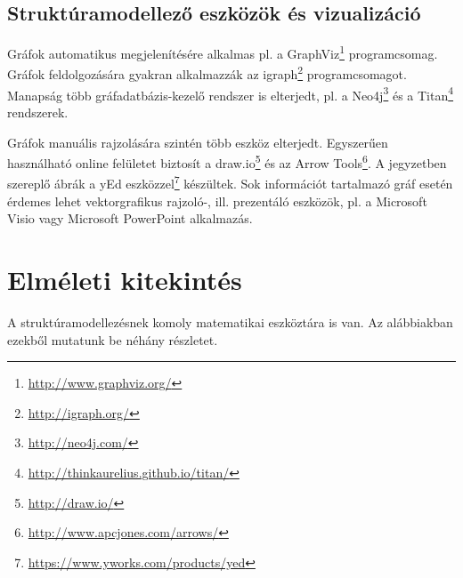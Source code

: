 \subsection{Struktúramodellező eszközök és vizualizáció}

Gráfok automatikus megjelenítésére alkalmas pl. a GraphViz\footnote{\url{http://www.graphviz.org/}} programcsomag. Gráfok feldolgozására gyakran alkalmazzák az igraph\footnote{\url{http://igraph.org/}} programcsomagot. Manapság több gráfadatbázis-kezelő rendszer is elterjedt, pl. a Neo4j\footnote{\url{http://neo4j.com/}} és a Titan\footnote{\url{http://thinkaurelius.github.io/titan/}} rendszerek.

Gráfok manuális rajzolására szintén több eszköz elterjedt. Egyszerűen használható online felületet biztosít a draw.io\footnote{\url{http://draw.io/}} és az Arrow Tools\footnote{\url{http://www.apcjones.com/arrows/}}. A jegyzetben szereplő ábrák a yEd eszközzel\footnote{\url{https://www.yworks.com/products/yed}} készültek. Sok információt tartalmazó gráf esetén érdemes lehet vektorgrafikus rajzoló-, ill. prezentáló eszközök, pl. a Microsoft Visio vagy Microsoft PowerPoint alkalmazás.


\section{Elméleti kitekintés\kieg}

A struktúramodellezésnek komoly matematikai eszköztára is van. Az alábbiakban ezekből mutatunk be néhány részletet.

%
%
%



